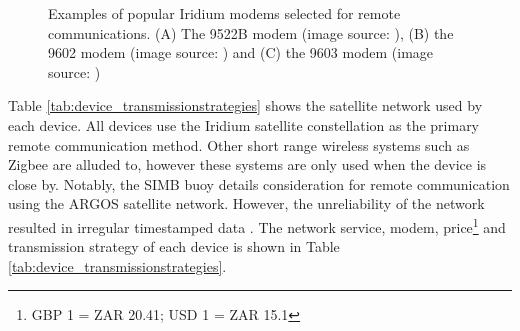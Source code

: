 \begin{figure}[H]
	\centering
	\begin{subfigure}[b]{0.3\textwidth}
	\end{subfigure}%
	\hfill
	\begin{subfigure}[b]{0.3\textwidth}
	\end{subfigure}%
	\hfill
	\begin{subfigure}[b]{0.3\textwidth}
	\end{subfigure}%
	\hfill
	\caption{Examples of popular Iridium modems selected for remote communications. (A) The 9522B modem (image source: \cite{9522B}), (B) the 9602 modem  (image source: \cite{9602}) and (C) the 9603 modem (image source: \cite{9603})} 
	\label{fig:irid_modem}
\end{figure}

Table \ref{tab:device_transmissionstrategies} shows the satellite network used by each device. All devices use the Iridium satellite constellation as the primary remote communication method. Other short range wireless systems such as Zigbee \cite{guimaraes2018surface} are alluded to, however these systems are only used when the device is close by. Notably, the SIMB buoy details consideration for remote communication using the ARGOS satellite network. However, the unreliability of the network resulted in irregular timestamped data \cite{planck2019evolution}. The network service, modem, price\footnote{GBP 1 = ZAR 20.41; USD 1 = ZAR 15.1} and transmission strategy of each device is shown in Table \ref{tab:device_transmissionstrategies}.


